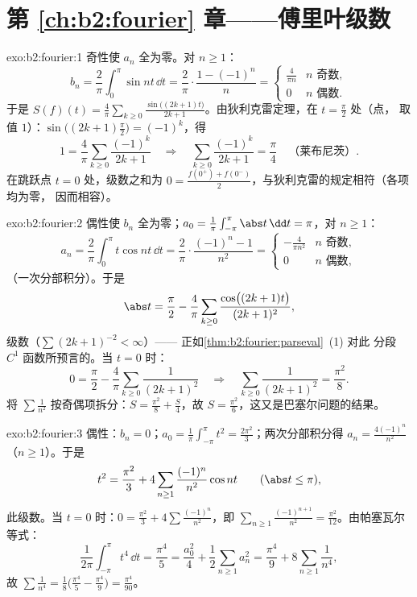 \section*{第 \ref{ch:b2:fourier} 章——傅里叶级数}

\begin{solution}{exo:b2:fourier:1}
奇性使 $a_n$ 全为零。对 $n \geq 1$：
\[
b_n = \frac{2}{\pi}\int_0^{\pi} \sin nt\,\dd t
= \frac{2}{\pi}\cdot\frac{1 - (-1)^n}{n}
= \begin{cases} \frac{4}{\pi n} & n \text{ 奇数},\\ 0 & n
\text{ 偶数}. \end{cases}
\]
于是 $S(f)(t) = \frac{4}{\pi}\sum_{k\geq0} \frac{\sin\bigl((2k+1)t
\bigr)}{2k+1}$。由狄利克雷定理，在 $t = \frac\pi2$ 处（点，
取值 $1$）：$\sin\bigl((2k+1)\frac\pi2\bigr) = (-1)^k$，得
\[
1 = \frac4\pi \sum_{k\geq0}\frac{(-1)^k}{2k+1}
\quad\Longrightarrow\quad
\sum_{k\geq0}\frac{(-1)^k}{2k+1} = \frac{\pi}{4}
\quad\text{（莱布尼茨）}.
\]
在跳跃点 $t = 0$ 处，级数之和为 $0 = \frac{f(0^+) +
f(0^-)}{2}$，与狄利克雷的规定相符（各项均为零，
因而相容）。
\end{solution}

\begin{solution}{exo:b2:fourier:2}
偶性使 $b_n$ 全为零；$a_0 = \frac{1}{\pi}\int_{-\pi}^\pi\abs
t\,\dd t = \pi$，对 $n \geq 1$：
\[
a_n = \frac{2}{\pi}\int_0^\pi t\cos nt\,\dd t
= \frac{2}{\pi}\cdot\frac{(-1)^n - 1}{n^2}
= \begin{cases} -\frac{4}{\pi n^2} & n \text{ 奇数},\\ 0 & n
\text{ 偶数}, \end{cases}
\]
（一次分部积分）。于是
\[
\abs t = \frac{\pi}{2} - \frac{4}{\pi}\sum_{k\geq0}
\frac{\cos\bigl((2k+1)t\bigr)}{(2k+1)^2} ,
\]
级数\emph{}（$\sum (2k+1)^{-2} < \infty$）——
正如\cref{thm:b2:fourier:parseval}~(1) 对此
分段 $C^1$ 函数所预言的。当 $t = 0$ 时：
\[
0 = \frac\pi2 - \frac4\pi\sum_{k\geq0}\frac{1}{(2k+1)^2}
\quad\Longrightarrow\quad
\sum_{k\geq0}\frac{1}{(2k+1)^2} = \frac{\pi^2}{8} .
\]
将 $\sum \frac{1}{n^2}$ 按奇偶项拆分：$S =
\frac{\pi^2}{8} + \frac S4$，故 $S = \frac{\pi^2}{6}$，这又是巴塞尔问题的结果。
\end{solution}

\begin{solution}{exo:b2:fourier:3}
偶性：$b_n = 0$；$a_0 = \frac{1}{\pi}\int_{-\pi}^{\pi} t^2 =
\frac{2\pi^2}{3}$；两次分部积分得 $a_n =
\frac{4(-1)^n}{n^2}$（$n \geq 1$）。于是
\[
t^2 = \frac{\pi^2}{3} + 4\sum_{n\geq1}
\frac{(-1)^n}{n^2}\cos nt
\qquad (\abs t \leq \pi),
\]
此级数。当 $t = 0$ 时：$0 = \frac{\pi^2}{3} +
4\sum\frac{(-1)^n}{n^2}$，即 $\sum_{n\geq1}
\frac{(-1)^{n+1}}{n^2} = \frac{\pi^2}{12}$。由帕塞瓦尔等式：
\[
\frac{1}{2\pi}\int_{-\pi}^{\pi} t^4\,\dd t = \frac{\pi^4}{5}
= \frac{a_0^2}{4} + \frac12\sum_{n\geq1} a_n^2
= \frac{\pi^4}{9} + 8\sum_{n\geq1}\frac{1}{n^4} ,
\]
故 $\sum \frac{1}{n^4} = \frac18\bigl(\frac{\pi^4}{5} -
\frac{\pi^4}{9}\bigr) = \frac{\pi^4}{90}$。
\end{solution}

